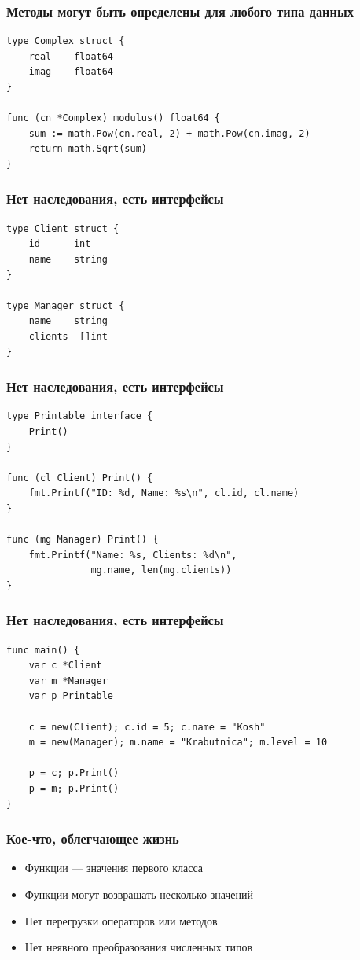 \documentclass{beamer}
\begin{document}
\begin{frame}[fragile]
  \frametitle{Методы могут быть определены для любого типа данных}
\begin{verbatim}
type Complex struct {
    real    float64
    imag    float64
}

func (cn *Complex) modulus() float64 {
    sum := math.Pow(cn.real, 2) + math.Pow(cn.imag, 2)
    return math.Sqrt(sum)
}

\end{verbatim}
\end{frame}


\begin{frame}[fragile]
  \frametitle{Нет наследования, есть интерфейсы}
\begin{verbatim}
type Client struct {
    id      int
    name    string
}

type Manager struct {
    name    string
    clients  []int
}
\end{verbatim}
\end{frame}


\begin{frame}[fragile]
  \frametitle{Нет наследования, есть интерфейсы}
\begin{verbatim}
type Printable interface {
    Print()
}

func (cl Client) Print() {
    fmt.Printf("ID: %d, Name: %s\n", cl.id, cl.name)
}

func (mg Manager) Print() {
    fmt.Printf("Name: %s, Clients: %d\n",
               mg.name, len(mg.clients))
}
\end{verbatim}
\end{frame}


\begin{frame}[fragile]
  \frametitle{Нет наследования, есть интерфейсы}
\begin{verbatim}
func main() {
    var c *Client
    var m *Manager
    var p Printable

    c = new(Client); c.id = 5; c.name = "Kosh"
    m = new(Manager); m.name = "Krabutnica"; m.level = 10

    p = c; p.Print()
    p = m; p.Print()
}
\end{verbatim}
\end{frame}


\begin{frame}
  \frametitle{Кое-что, облегчающее жизнь}
  \begin{itemize}
  \item Функции — значения первого класса
    \pause
  \item Функции могут возвращать несколько значений
    \pause
  \item Нет перегрузки операторов или методов
    \pause
  \item Нет неявного преобразования численных типов
  \end{itemize}
\end{frame}
\end{document}
